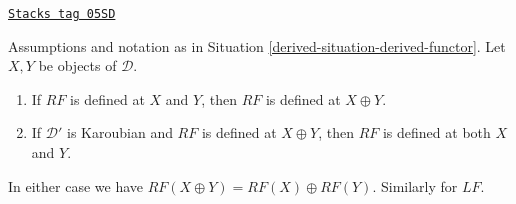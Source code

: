 \begin{lemma}
\label{derived-lemma-direct-sum-defined}
\href{https://stacks.math.columbia.edu/tag/05SD}{\texttt{Stacks tag 05SD}}

Assumptions and notation as in Situation \ref{derived-situation-derived-functor}.
Let $X, Y$ be objects of $\mathcal{D}$.
\begin{enumerate}
\item If $RF$ is defined at $X$ and $Y$, then $RF$ is defined at $X \oplus Y$.
\item If $\mathcal{D}'$ is Karoubian and $RF$ is defined at $X \oplus Y$,
then $RF$ is defined at both $X$ and $Y$.
\end{enumerate}
In either case we have $RF(X \oplus Y) = RF(X) \oplus RF(Y)$.
Similarly for $LF$.
\end{lemma}

